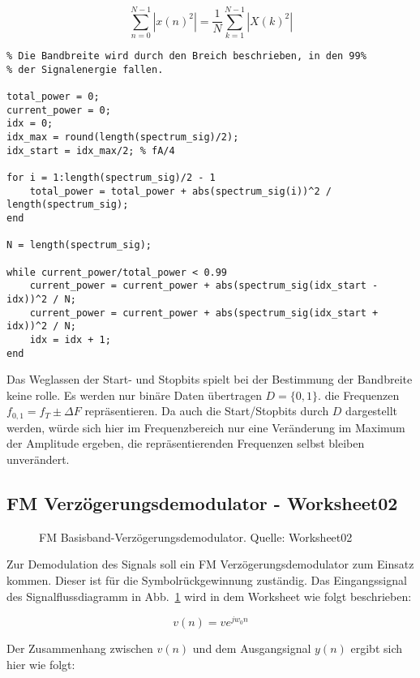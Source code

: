 \documentclass{article}
\begin{document}
$$
\sum_{n = 0}^{N - 1}\left\lvert x(n)^2\right\rvert =  \frac{1}{N} \sum_{k = 1}^{N-1}  \left\lvert X(k)^2\right\rvert 
$$
\begin{listing}
\begin{verbatim}
% Die Bandbreite wird durch den Breich beschrieben, in den 99%
% der Signalenergie fallen.

total_power = 0;
current_power = 0;
idx = 0;
idx_max = round(length(spectrum_sig)/2);
idx_start = idx_max/2; % fA/4

for i = 1:length(spectrum_sig)/2 - 1
    total_power = total_power + abs(spectrum_sig(i))^2 / length(spectrum_sig);
end

N = length(spectrum_sig);

while current_power/total_power < 0.99
    current_power = current_power + abs(spectrum_sig(idx_start - idx))^2 / N;
    current_power = current_power + abs(spectrum_sig(idx_start + idx))^2 / N;
    idx = idx + 1;
end
\end{verbatim}
\end{listing}

Das Weglassen der Start- und Stopbits spielt bei der Bestimmung der Bandbreite keine rolle.
Es werden nur binäre Daten übertragen $D = \{0, 1\}$. die Frequenzen $ f_{0, 1} = f_T \pm \varDelta F $ repräsentieren. 
Da auch die Start/Stopbits durch $D$ dargestellt werden, würde sich hier im Frequenzbereich
nur eine Veränderung im Maximum der Amplitude ergeben, die repräsentierenden Frequenzen selbst bleiben unverändert.

\subsection{FM Verzögerungsdemodulator - Worksheet02}

\begin{figure}[!h]
    \centering
    \def\svgscale{0.5}
    \def\svgwidth{\columnwidth}
%    
    \caption{FM Basisband-Verzögerungsdemodulator. Quelle: Worksheet02}
    \label{fig:fm-verz}
\end{figure}

Zur Demodulation des Signals soll ein FM Verzögerungsdemodulator zum Einsatz kommen. Dieser ist für die Symbolrückgewinnung zuständig. 
Das Eingangssignal des Signalflussdiagramm in Abb.~\ref{fig:fm-verz} wird in dem Worksheet wie folgt beschrieben:

$$
v(n) = v e^{j w_0 n}
$$

Der Zusammenhang zwischen $v(n)$ und dem Ausgangsignal $y(n)$ ergibt sich hier wie folgt:
\end{document}
